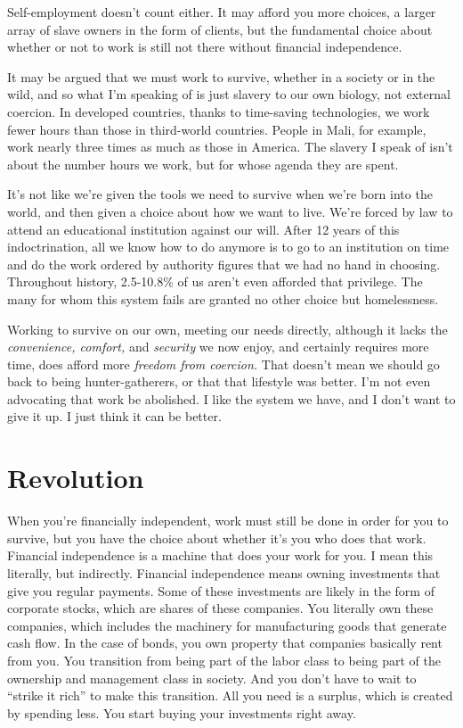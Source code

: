 Self-employment doesn't count either. It may afford you more choices, a larger array of slave owners in the form of clients, but the fundamental choice about whether or not to work is still not there without financial independence.

It may be argued that we must work to survive, whether in a society or in the wild, and so what I'm speaking of is just slavery to our own biology, not external coercion. In developed countries, thanks to time-saving technologies, we work fewer hours than those in third-world countries. People in Mali, for example, work nearly three times as much as those in America. The slavery I speak of isn't about the number hours we work, but for whose agenda they are spent.

It's not like we're given the tools we need to survive when we're born into the world, and then given a choice about how we want to live. We're forced by law to attend an educational institution against our will. After 12 years of this indoctrination, all we know how to do anymore is to go to an institution on time and do the work ordered by authority figures that we had no hand in choosing. Throughout history, 2.5-10.8\% of us aren't even afforded that privilege.\cite{multpl-unemployment} The many for whom this system fails are granted no other choice but homelessness.

Working to survive on our own, meeting our needs directly, although it lacks the \emph{convenience, comfort,} and \emph{security} we now enjoy, and certainly requires more time, does afford more \emph{freedom from coercion.} That doesn't mean we should go back to being hunter-gatherers, or that that lifestyle was better. I'm not even advocating that work be abolished. I like the system we have, and I don't want to give it up. I just think it can be better.

\section{Revolution}
When you're financially independent, work must still be done in order for you to survive, but you have the choice about whether it's you who does that work. Financial independence is a machine that does your work for you. I mean this literally, but indirectly. Financial independence means owning investments that give you regular payments. Some of these investments are likely in the form of corporate stocks, which are shares of these companies. You literally own these companies, which includes the machinery for manufacturing goods that generate cash flow. In the case of bonds, you own property that companies basically rent from you. You transition from being part of the labor class to being part of the ownership and management class in society. And you don't have to wait to ``strike it rich'' to make this transition. All you need is a surplus, which is created by spending less. You start buying your investments right away.

